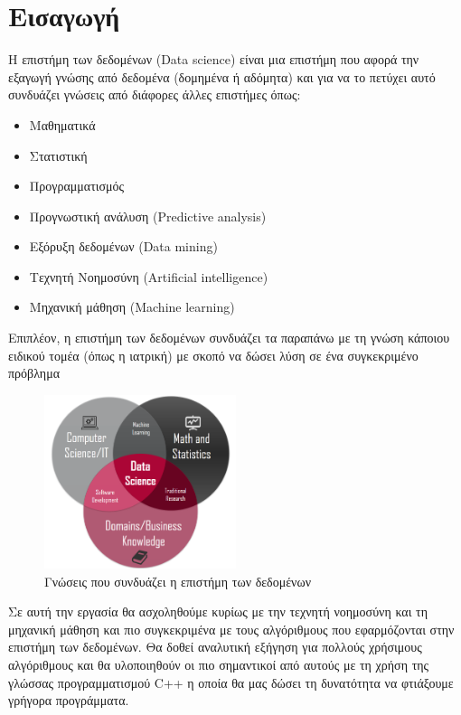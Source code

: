 \newpage
\section{Εισαγωγή}
Η επιστήμη των δεδομένων (\textlatin{Data science}) είναι
μια επιστήμη που αφορά την εξαγωγή γνώσης από δεδομένα
(δομημένα ή αδόμητα) και για να το πετύχει αυτό συνδυάζει
γνώσεις από διάφορες άλλες επιστήμες όπως:
\begin{itemize}
    \item Μαθηματικά
    \item Στατιστική
    \item Προγραμματισμός
    \item Προγνωστική ανάλυση (\textlatin{Predictive analysis})
    \item Εξόρυξη δεδομένων (\textlatin{Data mining})
    \item Τεχνητή Νοημοσύνη (\textlatin{Artificial intelligence})
    \item Μηχανική μάθηση (\textlatin{Machine learning})
\end{itemize}
Επιπλέον, η επιστήμη των δεδομένων συνδυάζει τα παραπάνω με
τη γνώση κάποιου ειδικού τομέα (όπως η ιατρική) με σκοπό να
δώσει λύση σε ένα συγκεκριμένο πρόβλημα \cite{wikiDS}
\begin{figure}[H]
    \centering
    \includegraphics[width=0.5\textwidth]{images/dataScienceKnowledge.png}
    \caption{Γνώσεις που συνδυάζει η επιστήμη των δεδομένων}
\end{figure}

Σε αυτή την εργασία θα ασχοληθούμε κυρίως με την τεχνητή
νοημοσύνη και τη μηχανική μάθηση και πιο συγκεκριμένα με τους
αλγόριθμους που εφαρμόζονται στην επιστήμη των δεδομένων.
Θα δοθεί αναλυτική εξήγηση για πολλούς χρήσιμους αλγόριθμους
και θα υλοποιηθούν οι πιο σημαντικοί από αυτούς με τη χρήση
της γλώσσας προγραμματισμού \textlatin{C++} η οποία θα μας δώσει τη
δυνατότητα να φτιάξουμε γρήγορα προγράμματα.

